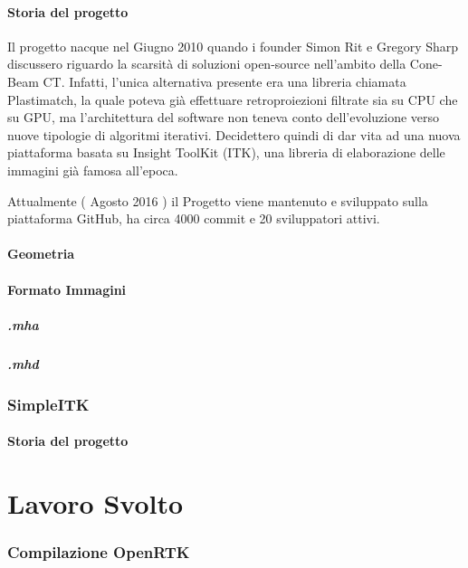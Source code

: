 \documentclass[a4paper,11pt, oneside]{article}
\begin{document}
            \subsection{Storia del progetto}
                \par 
                    Il progetto nacque nel Giugno 2010 quando i founder Simon Rit e Gregory Sharp discussero riguardo la scarsità di soluzioni open-source nell'ambito della Cone-Beam CT. Infatti, l'unica alternativa presente era una libreria chiamata Plastimatch, la quale poteva già effettuare retroproiezioni filtrate sia su CPU che su GPU, ma l'architettura del software non teneva conto dell'evoluzione verso nuove tipologie di algoritmi iterativi. Decidettero quindi di dar vita ad una nuova piattaforma basata su Insight ToolKit (ITK), una libreria di elaborazione delle immagini già famosa all'epoca.
                \par
                    Attualmente ( Agosto 2016 ) il Progetto viene mantenuto e sviluppato sulla piattaforma GitHub, ha circa 4000 commit e 20 sviluppatori attivi.
            \subsection{Geometria}
            \subsection{Formato Immagini}
                \subsubsection{.mha}
                \subsubsection{.mhd}
            
            
        \section{SimpleITK}
            \subsection{Storia del progetto}
        
    \part{Lavoro Svolto}
        \section{Compilazione OpenRTK}
\end{document}
